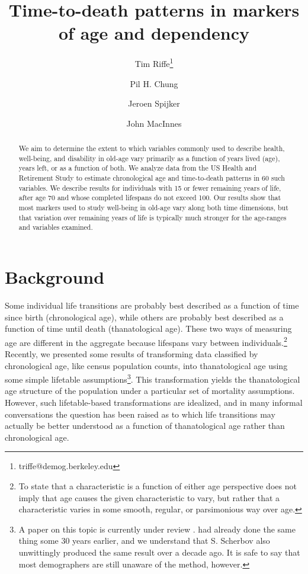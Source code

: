 \documentclass{article}
\begin{document}
\title{Time-to-death patterns in markers of age and dependency}

\author[1]{Tim Riffe\thanks{triffe@demog.berkeley.edu}}
\author[1]{Pil H. Chung}
\author[2,3]{Jeroen Spijker}
\author[4]{John MacInnes}

\maketitle

\begin{abstract}
We aim to determine the extent to which variables commonly
used to describe health, well-being, and disability in old-age vary primarily
as a function of years lived (age), years left, or as a function of both. We analyze data from the US Health and Retirement Study to estimate
chronological age and time-to-death patterns in 60 such variables. We describe
results for individuals with 15 or fewer remaining years of life, after age 70
and whose completed lifespans do not exceed 100. Our results show that most
markers used to study well-being in old-age vary along both time dimensions, but
that variation over remaining years of life is typically much stronger for
the age-ranges and variables examined.
\end{abstract}

\section{Background}
Some individual life transitions are probably best described as a function of
time since birth (chronological age), while others are probably best described as a
function of time until death (thanatological age). These two ways of
measuring age are different in the aggregate because lifespans vary between
individuals.\footnote{To state that a characteristic is a function of either age
perspective does not imply that age causes the given
characteristic to vary, but rather that a characteristic varies in some
smooth, regular, or parsimonious way over age.} Recently, we
presented some results of transforming data classified by chronological age, like census population counts, into thanatological age using some simple lifetable
assumptions\footnote{A paper on this topic is
currently under review \citep{riffe2014paaposter}. \citet{brouard1986structure,
brouard1989mouvements} had already done the same thing some 30 years earlier, and we understand that
S. Scherbov also unwittingly produced the same result over a decade ago. It is
safe to say that most demographers are still unaware of the method, however.}.
This transformation yields the thanatological age structure of the population
under a particular set of mortality assumptions.
However, such lifetable-based transformations are idealized, and in many informal
conversations the question has been raised as to which life transitions
may actually be better understood as a function of thanatological
age rather than chronological age.
\end{document}

